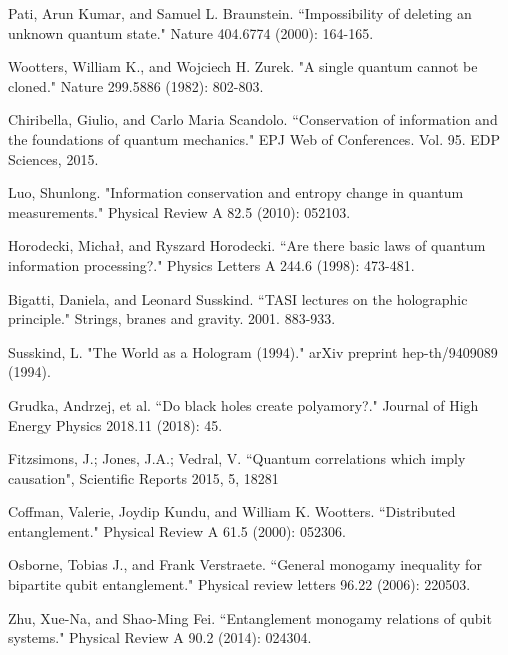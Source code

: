 \documentclass[fleqn,usenatbib]{mnras}
\begin{document}
\begin{thebibliography}{99}
Pati, Arun Kumar, and Samuel L. Braunstein. ``Impossibility of deleting an unknown quantum state." Nature 404.6774 (2000): 164-165.

Wootters, William K., and Wojciech H. Zurek. "A single quantum cannot be cloned." Nature 299.5886 (1982): 802-803.

Chiribella, Giulio, and Carlo Maria Scandolo. ``Conservation of information and the foundations of quantum mechanics." EPJ Web of Conferences. Vol. 95. EDP Sciences, 2015.

Luo, Shunlong. "Information conservation and entropy change in quantum measurements." Physical Review A 82.5 (2010): 052103.

Horodecki, Michał, and Ryszard Horodecki. ``Are there basic laws of quantum information processing?." Physics Letters A 244.6 (1998): 473-481.

Bigatti, Daniela, and Leonard Susskind. ``TASI lectures on the holographic principle." Strings, branes and gravity. 2001. 883-933.

Susskind, L. "The World as a Hologram (1994)." arXiv preprint hep-th/9409089 (1994).

Grudka, Andrzej, et al. ``Do black holes create polyamory?." Journal of High Energy Physics 2018.11 (2018): 45.

Fitzsimons, J.; Jones, J.A.; Vedral, V. ``Quantum correlations which imply causation", Scientific Reports 2015, 5, 18281

Coffman, Valerie, Joydip Kundu, and William K. Wootters. ``Distributed entanglement." Physical Review A 61.5 (2000): 052306.

Osborne, Tobias J., and Frank Verstraete. ``General monogamy inequality for bipartite qubit entanglement." Physical review letters 96.22 (2006): 220503.

Zhu, Xue-Na, and Shao-Ming Fei. ``Entanglement monogamy relations of qubit systems." Physical Review A 90.2 (2014): 024304.


\end{thebibliography}
\end{document}
